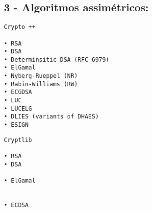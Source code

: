 \documentclass[
    article,            %
    11pt,               %
    oneside,            %
    a4paper,            %
    english,            %
    brazil,             %
    sumario=tradicional,
    ]{abntex2}
\begin{document}
\subsection*{\textbf{3 - Algoritmos assimétricos:}}

\par\noindent
\begin{minipage}[t]{.49\textwidth}
\begin{Verbatim}[frame=single]
             Crypto ++

• RSA
• DSA
• Determinsitic DSA (RFC 6979)
• ElGamal
• Nyberg-Rueppel (NR)
• Rabin-Williams (RW)
• ECGDSA
• LUC
• LUCELG
• DLIES (variants of DHAES)
• ESIGN

\end{Verbatim}
\end{minipage}
\hfill
\begin{minipage}[t]{.49\textwidth}
\begin{Verbatim}[frame=single]
             Cryptlib

• RSA
• DSA

• ElGamal


• ECDSA





\end{Verbatim}
\end{minipage}
\end{document}
